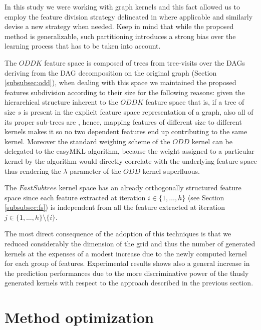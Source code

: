 In this study we were working with graph kernels and this fact allowed us to employ
the feature division strategy delineated in \cite{gmkl} where applicable and similarly
devise a new strategy when needed.
Keep in mind that while the proposed method is generalizable, such partitioning
introduces a strong bias over the learning process that has to be taken into account.

The $ODDK$ feature space is composed of trees from tree-visits
over the DAGs deriving from the DAG decomposition on the original graph (Section \ref{subsubsec:odd}),
when dealing with this space we maintained the proposed features subdivision
according to their size for the following reasons:
given the hierarchical structure inherent to the $ODDK$ feature space that is, if a tree
of size $s$ is present in the explicit feature space representation of a graph,
also all of its proper sub-trees are \cite{gmkl},
hence, mapping features of different size to different kernels makes it so no two
dependent features end up contributing to the same kernel.
Moreover the standard weighing scheme of the $ODD$ kernel can be delegated to
the easyMKL algorithm, because the weight assigned to a
particular kernel by the algorithm would directly correlate with the underlying
feature space thus rendering the $\lambda$ parameter of the $ODD$ kernel superfluous.

The $Fast Subtree$ kernel space has an already orthogonally structured feature
space since each feature extracted at iteration $i \in \{1,\dots,h\}$ (see Section \ref{subsubsec:fs})
is independent from all the feature extracted at iteration $j \in \{1,\dots,h\}\setminus \{i\}$.

The most direct consequence of the adoption of this techniques is that we reduced
considerably the dimension of the grid and thus the number of generated kernels at
the expenses of a modest increase due to the newly computed kernel for each group
of features.
Experimental results shows also a general increase in the prediction performances
due to the more discriminative power of the thusly generated kernels with respect
to the approach described in the previous section.


\section{Method optimization}
\label{sec:opt}

